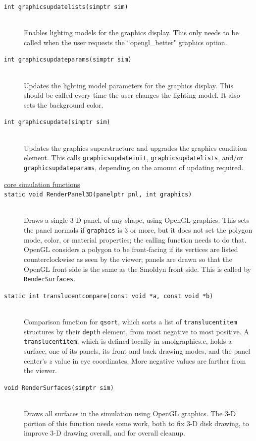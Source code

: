 \documentclass {scrbook}
\newcommand {\ttt} {\texttt}
\begin{document}
\begin{description}
\item[\ttt{int graphicsupdatelists(simptr sim)}]
\hfill \\
Enables lighting models for the graphics display. This only needs to be called when the user requests the ``opengl\_better" graphics option.

\item[\ttt{int graphicsupdateparams(simptr sim)}]
\hfill \\
Updates the lighting model parameters for the graphics display. This should be called every time the user changes the lighting model. It also sets the background color.

\item[\ttt{int graphicsupdate(simptr sim)}]
\hfill \\
Updates the graphics superstructure and upgrades the graphics condition element. This calls \ttt{graphicsupdateinit}, \ttt{graphicsupdatelists}, and/or \ttt{graphicsupdateparams}, depending on the amount of updating required.

\item[\underline{core simulation functions}]

\item[\ttt{static void RenderPanel3D(panelptr pnl, int graphics)}]
\hfill \\
Draws a single 3-D panel, of any shape, using OpenGL graphics. This sets the panel normals if \ttt{graphics} is 3 or more, but it does not set the polygon mode, color, or material properties; the calling function needs to do that. OpenGL considers a polygon to be front-facing if its vertices are listed counterclockwise as seen by the viewer; panels are drawn so that the OpenGL front side is the same as the Smoldyn front side. This is called by \ttt{RenderSurfaces}.

\item[\ttt{static int translucentcompare(const void *a, const void *b)}]
\hfill \\
Comparison function for \ttt{qsort}, which sorts a list of \ttt{translucentitem} structures by their \ttt{depth} element, from most negative to most positive. A \ttt{translucentitem}, which is defined locally in smolgraphics.c, holds a surface, one of its panels, its front and back drawing modes, and the panel center's $z$ value in eye coordinates. More negative values are farther from the viewer.

\item[\ttt{void RenderSurfaces(simptr sim)}]
\hfill \\
Draws all surfaces in the simulation using OpenGL graphics. The 3-D portion of this function needs some work, both to fix 3-D disk drawing, to improve 3-D drawing overall, and for overall cleanup.


\end{description}
\end{document}
